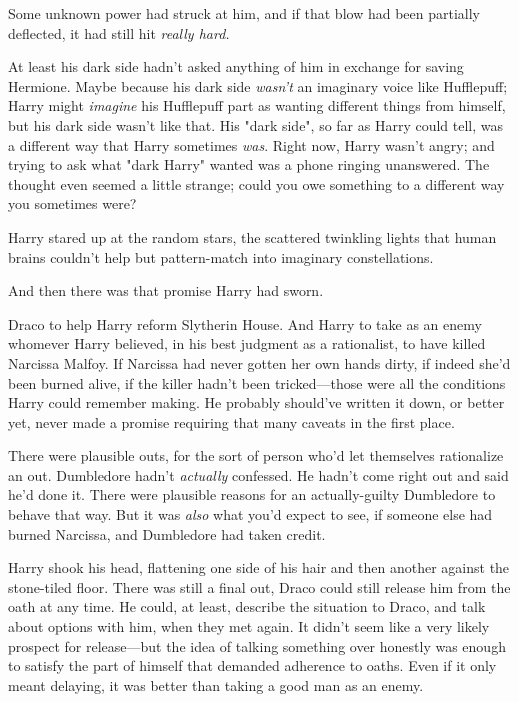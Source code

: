 Some unknown power had struck at him, and if that blow had been partially 
deflected, it had still hit \emph{really hard.}

At least his dark side hadn't asked anything of him in exchange for saving 
Hermione. Maybe because his dark side \emph{wasn't} an imaginary voice like 
Hufflepuff; Harry might \emph{imagine} his Hufflepuff part as wanting different 
things from himself, but his dark side wasn't like that. His "dark side", so 
far as Harry could tell, was a different way that Harry sometimes \emph{was}. 
Right now, Harry wasn't angry; and trying to ask what "dark Harry" wanted was a 
phone ringing unanswered. The thought even seemed a little strange; could you 
owe something to a different way you sometimes were?

Harry stared up at the random stars, the scattered twinkling lights that human 
brains couldn't help but pattern-match into imaginary constellations.

And then there was that promise Harry had sworn.

Draco to help Harry reform Slytherin House. And Harry to take as an enemy 
whomever Harry believed, in his best judgment as a rationalist, to have killed 
Narcissa Malfoy. If Narcissa had never gotten her own hands dirty, if indeed 
she'd been burned alive, if the killer hadn't been tricked---those were all the 
conditions Harry could remember making. He probably should've written it down, 
or better yet, never made a promise requiring that many caveats in the first 
place.

There were plausible outs, for the sort of person who'd let themselves 
rationalize an out. Dumbledore hadn't \emph{actually} confessed. He hadn't come 
right out and said he'd done it. There were plausible reasons for an 
actually-guilty Dumbledore to behave that way. But it was \emph{also} what 
you'd expect to see, if someone else had burned Narcissa, and Dumbledore had 
taken credit.

Harry shook his head, flattening one side of his hair and then another against 
the stone-tiled floor. There was still a final out, Draco could still release 
him from the oath at any time. He could, at least, describe the situation to 
Draco, and talk about options with him, when they met again. It didn't seem 
like a very likely prospect for release---but the idea of talking something 
over honestly was enough to satisfy the part of himself that demanded adherence 
to oaths. Even if it only meant delaying, it was better than taking a good man 
as an enemy.

